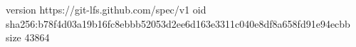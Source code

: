 version https://git-lfs.github.com/spec/v1
oid sha256:b78f4d03a19b16fc8ebbb52053d2ee6d163e3311c040e8df8a658fd91e94ecbb
size 43864
